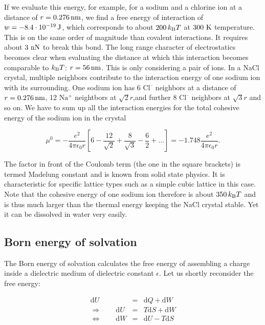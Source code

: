 \documentclass[letterpaper,10pt,english]{sphinxmanual}
\begin{document}
\sphinxAtStartPar
If we evaluate this energy, for example, for a sodium and a chlorine ion at a distance of \(r=0.276\, {\rm nm}\), we find a free energy of interaction of \(w=-8.4\cdot 10^{-19}\, {\rm J}\), which corresponds to about \(200\, k_{\rm B}T\) at \(300~\rm K\) temperature. This is on the same order of magnitude than covalent interactions. It requires about \(3~\rm nN\) to break this bond. The long range character of electrostatics becomes clear when evaluating the distance at which
this interaction becomes comparable to \(k_{\rm B}T\): \(r=56\, {\rm nm}\). This is only considering a pair of ions. In a NaCl crystal, multiple neighbors contribute to the interaction energy of one sodium ion with its surrounding. One sodium ion has 6 \(\mathrm{Cl^–}\) neighbors at a distance of \(r=0.276\, {\rm nm}\), 12 \(\mathrm{Na^+}\) neightbors at \(\sqrt{2}r\),and further 8 \(\mathrm{Cl^–}\) neighbors at \(\sqrt{3}r\) and so on. We have to sum up all the
interaction energies for the total cohesive energy of the sodium ion in the crystal

\sphinxAtStartPar
\begin{equation}
\mu^{0}=-\frac{e^2}{4\pi \epsilon_{0}r}\left [ 6-\frac{12}{\sqrt{2}}+\frac{8}{\sqrt{3}}-\frac{6}{2}+\ldots\right]=-1.748\frac{e^2}{4\pi \epsilon_{0}r}.
\end{equation}

\sphinxAtStartPar
The factor in front of the Coulomb term (the one in the square brackets) is termed Madelung constant and is known from solid state physics. It is characteristic for specific lattice types such as a simple cubic lattice in this case. Note that the cohesive energy of one sodium ion therefore is about \(350\, k_{\rm B}T\) and is thus much larger than the thermal energy keeping the NaCl crystal stable. Yet it can be dissolved in water very easily.


\subsection{Born energy of solvation}
\label{\detokenize{notebooks/L7/1_Forces and Interactions:Born-energy-of-solvation}}
\sphinxAtStartPar
The Born energy of solvation calculates the free energy of assembling a charge inside a dielectric medium of dielectric constant \(\epsilon\). Let us shortly reconsider the free energy:

\sphinxAtStartPar
\begin{eqnarray}
\mathrm dU&=&\mathrm dQ+\mathrm dW\\ \Rightarrow\qquad\mathrm dU&=&T\mathrm dS+\mathrm dW\\ \Leftrightarrow\qquad\mathrm dW&=&\mathrm dU-T\mathrm dS
\end{eqnarray}
\end{document}
